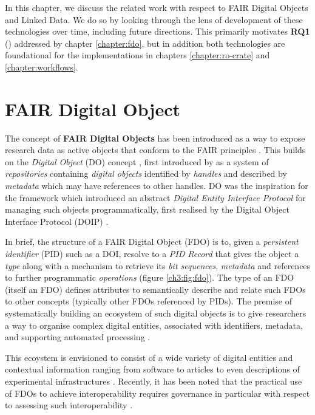 \label{ch3:background}

In this chapter, we discuss the related work with respect to FAIR Digital Objects and Linked Data. We do so by looking through the lens of development of these technologies over time, including future directions. This primarily motivates \textbf{RQ1} () addressed by chapter \ref{chapter:fdo}, but in addition both technologies are foundational for the implementations in chapters \ref{chapter:ro-crate} and \ref{chapter:workflows}.


\section{FAIR Digital Object}\label{ch3:fdo}


The concept of \textbf{FAIR Digital Objects} \cite{Schultes 2019} has been introduced as a way to expose research data as active objects that conform to the FAIR principles \cite{Wilkinson 2016}. This builds on the \emph{Digital Object} (DO) concept \cite{Kahn 2006}, first introduced by \cite{Kahn 1995} as a system of \emph{repositories} containing \emph{digital objects} identified by \emph{handles} \cite{Sun 2003a} and described by \emph{metadata} which may have references to other handles. DO was the inspiration for the \cite{ITU-T X.1255} framework which introduced an abstract \emph{Digital Entity Interface Protocol} for managing such objects programmatically, first realised by the Digital Object Interface Protocol (DOIP) \cite{Reilly 2009}.

In brief, the structure of a FAIR Digital Object (FDO) is to, given a \emph{persistent identifier} (PID) such as a DOI, resolve to a \emph{PID Record} that gives the object a \emph{type} along with a mechanism to retrieve its \emph{bit sequences}, \emph{metadata} and references to further programmatic \emph{operations} (figure \vref{ch3:fig:fdo}). The type of an FDO (itself an FDO) defines attributes to semantically describe and relate such FDOs to other concepts (typically other FDOs referenced by PIDs). The premise of systematically building an ecosystem of such digital objects is to give researchers a way to organise complex digital entities, associated with identifiers, metadata, and supporting automated processing \cite{Wittenburg 2019}.

This ecoystem is envisioned to consist of a wide variety of digital entities and contextual information ranging from software to articles to even descriptions of experimental infrastructures \cite{Azeroual 2022}.
Recently, it has been noted that the practical use of FDOs to achieve interoperability requires governance in particular with respect to assessing such interoperability \cite{Wilkinson 2023a}.

